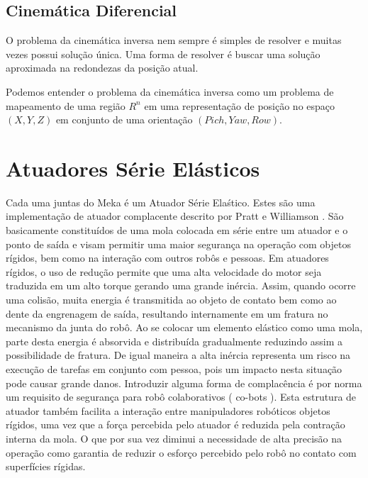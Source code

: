 \subsection{Cinemática Diferencial}

O problema da cinemática inversa nem sempre é simples de resolver e muitas vezes possui solução única. Uma forma de resolver é buscar uma solução aproximada na redondezas da posição atual.

Podemos entender o problema da cinemática inversa como um problema de mapeamento de uma região $R^n$ em uma representação de posição no espaço $(X,Y,Z)$ em conjunto de uma orientação $(Pich, Yaw, Row)$.


\section{Atuadores Série Elásticos}

Cada uma juntas do Meka é um Atuador Série Elaśtico. Estes são uma implementação de atuador complacente descrito por Pratt e Williamson \cite{pratt1995series}. São basicamente constituídos de uma mola colocada em série entre um atuador e o ponto de saída e visam permitir uma maior segurança na operação com objetos rígidos, bem como na interação com outros robôs e pessoas. Em atuadores rígidos, o uso de redução permite que uma alta velocidade do motor seja traduzida em um alto torque gerando uma grande inércia. Assim, quando ocorre uma colisão, muita energia é transmitida ao objeto de contato bem como ao dente da engrenagem de saída, resultando internamente em um fratura no mecanismo da junta do robô. Ao se colocar um elemento elástico como uma mola, parte desta energia é absorvida e distribuída gradualmente reduzindo assim a possibilidade de fratura. De igual maneira a alta inércia representa um risco na execução de tarefas em conjunto com pessoa, pois um impacto nesta situação pode causar grande danos. Introduzir alguma forma de complacência é por norma \cite{nobody} um requisito de segurança para robô colaborativos ( co-bots ). Esta estrutura de atuador também facilita a interação entre manipuladores robóticos objetos rígidos, uma vez que a força percebida pelo atuador é reduzida pela contração interna da mola. O que por sua vez diminui a necessidade de alta precisão na operação como garantia de reduzir o esforço percebido pelo robô no contato com superfícies rígidas.

